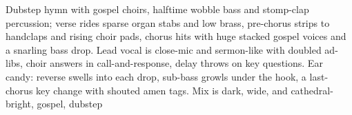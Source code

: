 
\begin{notes}

\end{notes}
\begin{style}
Dubstep hymn with gospel choirs, halftime wobble bass and stomp-clap percussion; verse rides sparse organ stabs and low brass, pre-chorus strips to handclaps and rising choir pads, chorus hits with huge stacked gospel voices and a snarling bass drop. %
Lead vocal is close-mic and sermon-like with doubled ad-libs, choir answers in call-and-response, delay throws on key questions. %
Ear candy: reverse swells into each drop, sub-bass growls under the hook, a last-chorus key change with shouted amen tags. %
Mix is dark, wide, and cathedral-bright, gospel, dubstep
\end{style}
